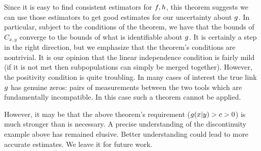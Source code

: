 Since it is easy to find consistent estimators for $f,h$, this theorem suggests we can use those estimators to get good estimates for our uncertainty about $g$.  In particular, subject to the conditions of the theorem, we have that the bounds of $C_{x,y}$ converge to the bounds of what is identifiable about $g$.  It is certainly a step in the right direction, but we emphasize that the theorem's conditions are nontrivial.  It is our opinion that the linear independence condition is fairly mild (if it is not met then subpopulations can simply be merged together).  However, the positivity condition is quite troubling.  In many cases of interest the true link $g$ has genuine zeros: pairs of measurements between the two tools which are fundamentally incompatible.  In this case such a theorem cannot be applied.  

However, it may be that the above theorem's requirement ($g(x|y)>c>0$) is much stronger than is necessary.  A precise understanding of the discontinuity example above has remained elusive.  Better understanding could lead to more accurate estimates.  We leave it for future work.









































